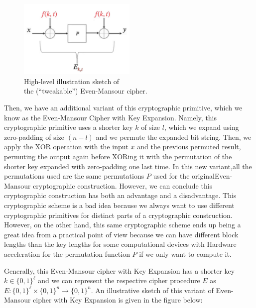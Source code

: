 \documentclass[12pt]{article}
\begin{document}
    \begin{figure}[ht]
        \captionsetup{justification=centering}
        \centering
        \includegraphics[width=0.5\textwidth]{figures/images/img-2.pdf}
        \caption{High-level illustration sketch of\\ the (``tweakable'') Even-Mansour cipher.}
    \end{figure}

    \noindent Then, we have an additional variant of this cryptographic primitive, which we know as the Even-Mansour Cipher with Key Expansion. Namely, this cryptographic primitive uses a shorter key $k$ of size $l$, which we expand using zero-padding of size $(n - l)$ and we permute the expanded bit string. Then, we apply the XOR operation with the input $x$ and the previous permuted result, permuting the output again before XORing it with the permutation of the shorter key expanded with zero-padding one last time. In this new variant,\break all the permutations used are the same permutations $P$ used for the original\break Even-Mansour cryptographic construction. However, we can conclude this cryptographic construction has both an advantage and a disadvantage. This cryptographic scheme is a bad idea because we always want to use different cryptographic primitives for distinct parts of a cryptographic construction. However, on the other hand, this same cryptographic scheme ends up being a great idea from a practical point of view because we can have different block lengths than the key lengths for some computational devices with Hardware acceleration for the permutation function $P$ if we only want to compute it.

    \noindent Generally, this Even-Mansour cipher with Key Expansion has a shorter key $k \in {\{0, 1 \}}^{\ell}$ and we can represent the respective cipher procedure $E$ as\break $E: {\{0,1\}}^{\ell} \times {\{0,1\}}^{n} \rightarrow {\{0,1\}}^{n}$. An illustrative sketch of this variant of Even-Mansour cipher with Key Expansion is given in the figure below:
\end{document}
